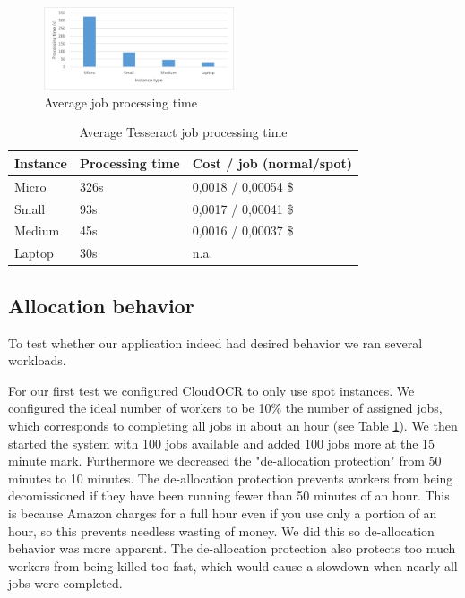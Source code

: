 \documentclass[a4paper]{IEEEtran}
\begin{document}
\begin{figure}
\centering
\includegraphics[width=0.5\textwidth]{"results-tesseract"}
\caption{Average job processing time}
\label{fig_tesperfresults}
\end{figure}

\begin{table}
\caption{Average Tesseract job processing time}
\label{tesperfresults}
\centering
\begin{tabular}{| l | l | l |}
\hline
Instance & Processing time & Cost / job (normal/spot) \\ \hline
Micro & 326s & 0,0018 / 0,00054 \$ \\ \hline
Small & 93s & 0,0017 / 0,00041 \$ \\ \hline
Medium & 45s & 0,0016 / 0,00037 \$ \\ \hline
Laptop & 30s & n.a. \\ \hline
\end{tabular}
\end{table}

\subsection{Allocation behavior}

To test whether our application indeed had desired behavior we ran several workloads.

For our first test we configured CloudOCR to only use spot instances. We configured the ideal number of workers to be 10\% the number of assigned jobs, which corresponds to completing all jobs in about an hour (see Table \ref{tesperfresults}). We then started the system with 100 jobs available and added 100 jobs more at the 15 minute mark.
Furthermore we decreased the "de-allocation protection" from 50 minutes to 10 minutes. The de-allocation protection prevents workers from being decomissioned if they have been running fewer than 50 minutes of an hour. This is because Amazon charges for a full hour even if you use only a portion of an hour, so this prevents needless wasting of money. We did this so de-allocation behavior was more apparent. The de-allocation protection also protects too much workers from being killed too fast, which would cause a slowdown when nearly all jobs were completed.
\end{document}
